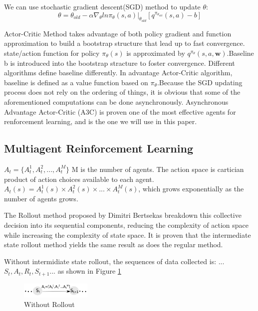 We can use stochastic gradient descent(SGD) method to update $\theta$:
\begin{equation}
    \theta=\theta_{old}-\alpha \nabla_{\theta}ln\pi_{\theta}(s,a)|_{\theta_{old}}[q^{\pi_{\theta_{old}}}(s,a)-b]
\end{equation}

Actor-Critic Method takes advantage of both policy gradient and function approximation to build a bootstrap structure that lead up to fast convergence. state/action function for policy $\pi_{\theta}(s)$ is approximated by $q^{\pi_{\theta}}(s,a,\textbf{w})$.Baseline b is introduced into the bootstrap stracture to foster convergence. Different algorithms define baseline differently. In advantage Actor-Critic algorithm, baseline is defined as a value function based on $\pi_{\theta}$.Because the SGD updating process does not rely on the ordering of things, it is obvious that some of the aforementioned computations can be done asynchronously. Asynchronous Advantage Actor-Critic (A3C) is proven one of the most effective agents for renforcement learning, and is the one we will use in this paper.

\subsection{Multiagent Reinforcement Learning}
$A_t=\{A_t^1,A_t^2,...,A_t^M\}$ M is the number of agents. The action space is cartician product of action choices available to each agent. $A_t(s)=A_t^1(s) \times A_t^2(s) \times ... \times A_t^M(s)$, which grows exponentially as the number of agents grows.

The Rollout method proposed by Dimitri Bertsekas breakdown this collective decision into its sequential components, reducing the complexity of action space while increasing the complexity of state space. It is proven that the intermediate state rollout method yields the same result as does the regular method. \cite{Bertsekas2019MultiagentRA}

Without intermidiate state rollout, the sequences of data collected is:
...$S_t, A_t, R_t, S_{t+1}$... as shown in Figure \ref{fig:without}

\begin{figure}[H]
\centering
\includegraphics[width=0.3\textwidth]{without.png}
\caption{Without Rollout}
\label{fig:without}
\end{figure}

